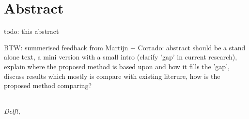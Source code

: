 \chapter*{Abstract}
todo: this abstract


BTW: summerised feedback from Martijn + Corrado:
abstract should be a stand alone text, a mini version with a small intro (clarify 'gap' in current research), explain where the proposed method is based upon and how it fills the 'gap', discuss results which mostly is compare with existing literure, how is the proposed method comparing? 




\begin{flushright}
{\makeatletter\itshape
    \@author \\
    Delft, \monthname{} \the\year{}
\makeatother}
\end{flushright}
